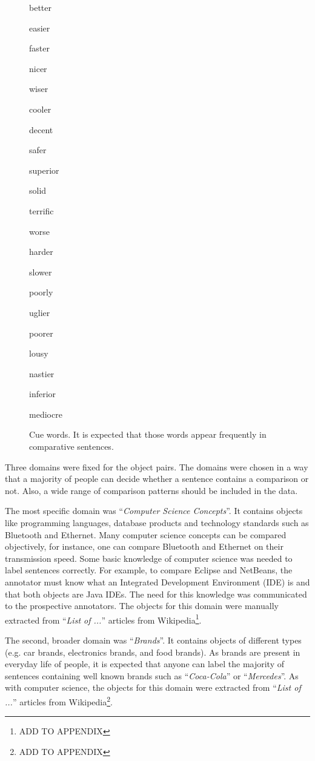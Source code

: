 \begin{figure}[h]
\centering
\caption{Cue words. It is expected that those words appear frequently in comparative sentences.}
\label{fig:cue_words}
\begin{multicols}{4}
better

easier

faster

nicer

wiser

cooler

decent

safer

superior

solid

terrific

worse

harder

slower

poorly

uglier

poorer

lousy

nastier

inferior

mediocre
\end{multicols}
\end{figure}

Three domains were fixed for the object pairs. The domains were chosen in a way that a majority of people can decide whether a sentence contains a comparison or not. Also, a wide range of comparison patterns should be included in the data.

The most specific domain was \enquote{\emph{Computer Science Concepts}}. It contains objects like programming languages, database products and technology standards such as Bluetooth and Ethernet.  Many computer science concepts can be compared objectively, for instance, one can compare Bluetooth and Ethernet on their transmission speed. Some basic knowledge of computer science was needed to label sentences correctly. For example, to compare Eclipse and NetBeans, the annotator must know what an Integrated Development Environment (IDE) is and that both objects are Java IDEs.  The need for this knowledge was communicated to the prospective annotators. The objects for this domain were manually extracted from \enquote{\emph{List of ...}} articles from Wikipedia\footnote{ADD TO APPENDIX}.

The second, broader domain was \enquote{\emph{Brands}}. It contains objects of different types (e.g. car brands, electronics brands, and food brands). As brands are present in everyday life of people, it is expected that anyone can label the majority of sentences containing well known brands such as \enquote{\emph{Coca-Cola}} or \enquote{\emph{Mercedes}}. As with computer science, the objects for this domain were extracted from \enquote{\emph{List of ...}} articles from Wikipedia\footnote{ADD TO APPENDIX}.


